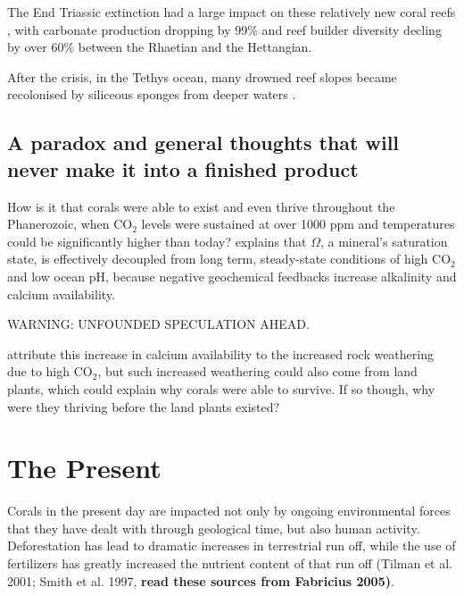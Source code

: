 \documentclass[11pt,a4paper]{article}
\begin{document}
The End Triassic extinction had a large impact on these relatively new coral reefs \citep{Kiessling2009}, with carbonate production dropping by 99\% and reef builder diversity decling by over 60\% between the Rhaetian and the Hettangian.%

After the crisis, in the Tethys ocean, many drowned reef slopes became recolonised by siliceous sponges from deeper waters \citep{Delecat2011}.
 




\subsection{A paradox and general thoughts that will never make it into a finished product}

How is it that corals were able to exist and even thrive throughout the Phanerozoic, when CO$_{2}$ levels were sustained at over 1000 ppm and temperatures could be significantly higher than today?
 \cite{Pandolfi2011} explains that $\Omega$, a mineral's saturation state, is effectively decoupled from long term, steady-state conditions of high CO$_{2}$ and low ocean pH, because negative geochemical feedbacks increase alkalinity and calcium availability.

WARNING: UNFOUNDED SPECULATION AHEAD.

 \cite{Pandolfi2011} attribute this increase in calcium availability to the increased rock weathering due to high CO$_{2}$, but such increased weathering could also come from land plants, which could explain why corals were able to survive. If so though, why were they thriving before the land plants existed?



\section{The Present}

Corals in the present day are impacted not only by ongoing environmental forces that they have dealt with through geological time, but also human activity.
 Deforestation has lead to dramatic increases in terrestrial run off, while the use of fertilizers has greatly increased the nutrient content of that run off (Tilman et al. 2001; Smith et al. 1997, \textbf{read these sources from Fabricius 2005)}. 
\end{document}
